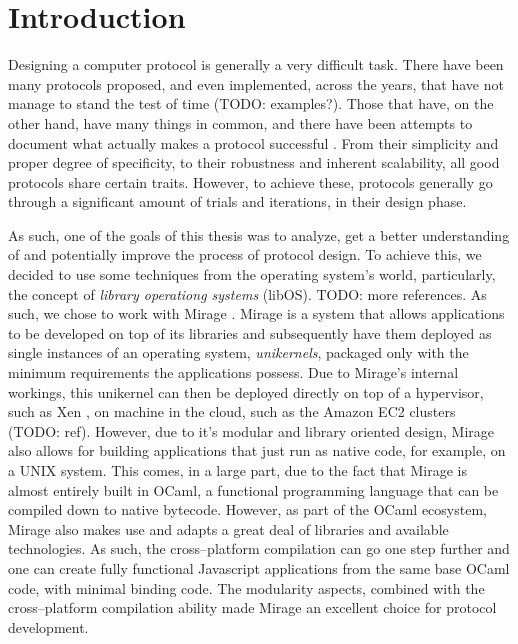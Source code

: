 \chapter{Introduction} \label{chapter:introduction}
\setcounter{page}{1}

Designing a computer protocol is generally a very difficult task.
There have been many protocols proposed, and even implemented, across the years, that have not manage to stand the test of time (TODO: examples?).
Those that have, on the other hand, have many things in common, and there have been attempts to document what actually makes a protocol successful \cite{RFC5218}.
From their simplicity and proper degree of specificity, to their robustness and inherent scalability, all good protocols share certain traits.
However, to achieve these, protocols generally go through a significant amount of trials and iterations, in their design phase.

As such, one of the goals of this thesis was to analyze, get a better understanding of and potentially improve the process of protocol design.
To achieve this, we decided to use some techniques from the operating system's world, particularly, the concept of \textit{library operationg systems} (libOS).
TODO: more references.
As such, we chose to work with Mirage \cite{Mirage}.
Mirage is a system that allows applications to be developed on top of its libraries and subsequently have them deployed as single instances of an operating system, \textit{unikernels}, packaged only with the minimum requirements the applications possess.
Due to Mirage's internal workings, this unikernel can then be deployed directly on top of a hypervisor, such as Xen \cite{Xen}, on machine in the cloud, such as the Amazon EC2 clusters (TODO: ref).
However, due to it's modular and library oriented design, Mirage also allows for building applications that just run as native code, for example, on a UNIX system.
This comes, in a large part, due to the fact that Mirage is almost entirely built in OCaml, a functional programming language that can be compiled down to native bytecode.
However, as part of the OCaml ecosystem, Mirage also makes use and adapts a great deal of libraries and available technologies.
As such, the cross--platform compilation can go one step further and one can create fully functional Javascript applications from the same base OCaml code, with minimal binding code.
The modularity aspects, combined with the cross--platform compilation ability made Mirage an excellent choice for protocol development.

